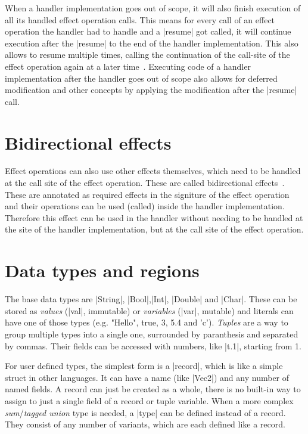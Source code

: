 When a handler implementation goes out of scope, it will also finish execution of all its handled effect operation calls. This means for every call of an effect operation the handler had to handle and a |resume| got called, it will continue execution after the |resume| to the end of the handler implementation. This also allows to resume multiple times, calling the continuation of the call-site of the effect operation again at a later time~\cite{brachthauser2020effects}\cite{muhcu2025multipleresumptions}. Executing code of a handler implementation after the handler goes out of scope also allows for deferred modification and other concepts by applying the modification after the |resume| call.

\section{Bidirectional effects}

Effect operations can also use other effects themselves, which need to be handled at the call site of the effect operation. These are called bidirectional effects~\cite{zhang2020bidirectional}. These are annotated as required effects in the signiture of the effect operation and their operations can be used (called) inside the handler implementation. Therefore this effect can be used in the handler without needing to be handled at the site of the handler implementation, but at the call site of the effect operation.

\section{Data types and regions}

The base data types are |String|, |Bool|,|Int|, |Double| and |Char|. These can be stored as \textit{values} (|val|, immutable) or \textit{variables} (|var|, mutable) and literals can have one of those types (e.g. "Hello", true, 3, 5.4 and 'c'). \textit{Tuples} are a way to group multiple types into a single one, surrounded by paranthesis and separated by commas. Their fields can be accessed with numbers, like |t.1|, starting from 1.

For user defined types, the simplest form is a |record|, which is like a simple struct in other languages. It can have a name (like |Vec2|) and any number of named fields. A record can just be created as a whole, there is no built-in way to assign to just a single field of a record or tuple variable. When a more complex \textit{sum}/\textit{tagged union} type is needed, a |type| can be defined instead of a record. They consist of any number of variants, which are each defined like a record.

